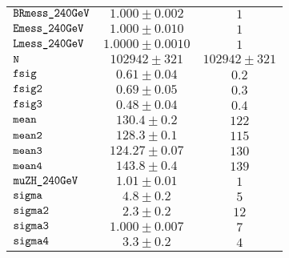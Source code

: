 \begin{tabular}{lcc}
$\verb+BRmess_240GeV+ $ & $  1.000\pm 0.002$ & $ 1$\\
$\verb+Emess_240GeV+ $ & $  1.000\pm 0.010$ & $ 1$\\
$\verb+Lmess_240GeV+ $ & $  1.0000\pm 0.0010$ & $ 1$\\
$\verb+N+ $ & $  102942\pm 321$ & $ 102942\pm 321$\\
$\verb+fsig+ $ & $  0.61\pm 0.04$ & $ 0.2$\\
$\verb+fsig2+ $ & $  0.69\pm 0.05$ & $ 0.3$\\
$\verb+fsig3+ $ & $  0.48\pm 0.04$ & $ 0.4$\\
$\verb+mean+ $ & $  130.4\pm 0.2$ & $ 122$\\
$\verb+mean2+ $ & $  128.3\pm 0.1$ & $ 115$\\
$\verb+mean3+ $ & $  124.27\pm 0.07$ & $ 130$\\
$\verb+mean4+ $ & $  143.8\pm 0.4$ & $ 139$\\
$\verb+muZH_240GeV+ $ & $  1.01\pm 0.01$ & $ 1$\\
$\verb+sigma+ $ & $  4.8\pm 0.2$ & $ 5$\\
$\verb+sigma2+ $ & $  2.3\pm 0.2$ & $ 12$\\
$\verb+sigma3+ $ & $  1.000\pm 0.007$ & $ 7$\\
$\verb+sigma4+ $ & $  3.3\pm 0.2$ & $ 4$\\
\end{tabular}
